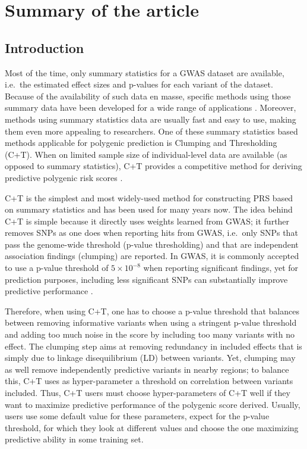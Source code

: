 \section{Summary of the article}

\subsection{Introduction}

Most of the time, only summary statistics for a GWAS dataset are available, i.e.\ the estimated effect sizes and p-values for each variant of the dataset. Because of the availability of such data en masse, specific methods using those summary data have been developed for a wide range of applications \cite[]{pasaniuc2014fast,vilhjalmsson2015modeling,bulik2015ld,pasaniuc2017dissecting,speed2018sumher}. Moreover, methods using summary statistics data are usually fast and easy to use, making them even more appealing to researchers.
One of these summary statistics based methods applicable for polygenic prediction is Clumping and Thresholding (C+T).
When on limited sample size of individual-level data are available (as opposed to summary statistics), C+T provides a competitive method for deriving predictive polygenic risk scores \cite[]{prive2019efficient}.

C+T is the simplest and most widely-used method for constructing PRS based on summary statistics and has been used for many years now. The idea behind C+T is simple because it directly uses weights learned from GWAS; it further removes SNPs as one does when reporting hits from GWAS, i.e.\ only SNPs that pass the genome-wide threshold (p-value thresholding) and that are independent association findings (clumping) are reported.
In GWAS, it is commonly accepted to use a p-value threshold of $5 \times 10^{-8}$ when reporting significant findings, yet for prediction purposes, including less significant SNPs can substantially improve predictive performance \cite[]{purcell2009common}.

Therefore, when using C+T, one has to choose a p-value threshold that balances between removing informative variants when using a stringent p-value threshold and adding too much noise in the score by including too many variants with no effect. The clumping step aims
at removing redundancy in included effects that is simply due to linkage disequilibrium (LD) between variants. Yet, clumping may as well remove independently predictive variants in nearby regions; to balance this, C+T uses as hyper-parameter a threshold on correlation between variants included. 
Thus, C+T users must choose hyper-parameters of C+T well if they want to maximize predictive performance of the polygenic score derived.
Usually, users use some default value for these parameters, expect for the p-value threshold, for which they look at different values and choose the one maximizing predictive ability in some training set.

